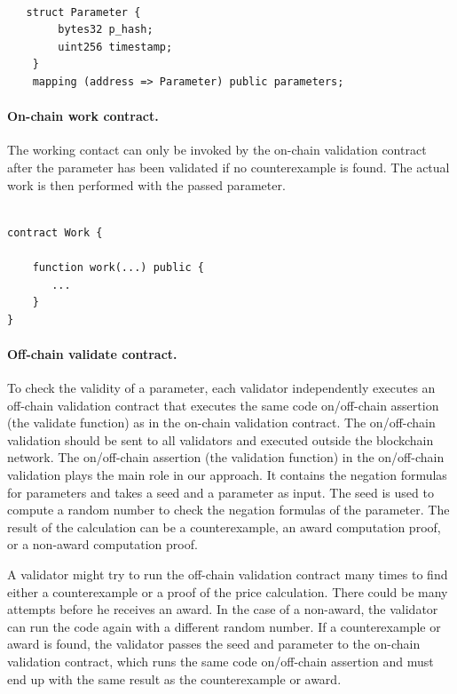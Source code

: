 \documentclass[runningheads]{llncs}
\begin{document}
\begin{lstlisting}[numbers=none]

   struct Parameter {
        bytes32 p_hash;
        uint256 timestamp;
    }
    mapping (address => Parameter) public parameters;
\end{lstlisting}
 


\paragraph{On-chain work contract.}  The working contact can only be invoked by the on-chain validation contract after the parameter has been validated if no counterexample is found. The actual work is then performed with the passed parameter.

\begin{lstlisting}[numbers=none]

contract Work {
  
    function work(...) public {
       ...
    } 
}
\end{lstlisting}

\paragraph{Off-chain validate contract.}
To check the validity of a parameter, each validator independently executes an off-chain validation contract that executes the same code on/off-chain assertion (the validate function) as in the on-chain validation contract. The on/off-chain validation should be sent to all validators and executed outside the blockchain network. The on/off-chain assertion (the validation function) in the on/off-chain validation plays the main role in our approach. It contains the negation formulas for parameters and takes a seed and a parameter as input. The seed is used to compute a random number to check the negation formulas of the parameter. The result of the calculation can be a counterexample, an award computation proof, or a non-award computation proof.

A validator might try to run the off-chain validation contract many times to find either a counterexample or a proof of the price calculation. There could be many attempts before he receives an award. In the case of a non-award, the validator can run the code again with a different random number. If a counterexample or award is found, the validator passes the seed and parameter to the on-chain validation contract, which runs the same code on/off-chain assertion and must end up with the same result as the counterexample or award.
\end{document}
